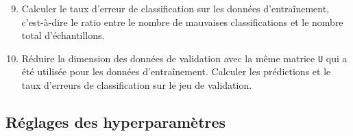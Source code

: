 %
\begin{enumerate}
\setcounter{enumi}{8}
	\item Calculer le taux d'erreur de classification sur les données d'entraînement, c'est-à-dire le ratio entre le nombre de mauvaises classifications et le nombre total d'échantillons.
	\item Réduire la dimension des données de validation avec la même matrice \texttt{U} qui a été utilisée pour les données d'entraînement. Calculer les prédictions et le taux d'erreurs de classification sur le jeu de validation.
\end{enumerate}

\subsection{Réglages des hyperparamètres}


